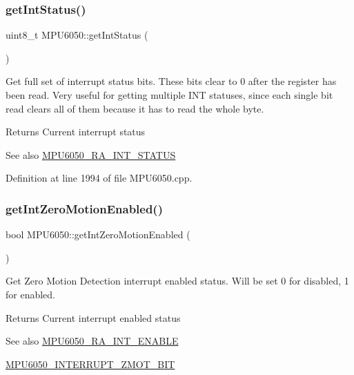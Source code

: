 \subsubsection{\texorpdfstring{getIntStatus()}{getIntStatus()}}
{\footnotesize\ttfamily uint8\+\_\+t M\+P\+U6050\+::get\+Int\+Status (\begin{DoxyParamCaption}{ }\end{DoxyParamCaption})}

Get full set of interrupt status bits. These bits clear to 0 after the register has been read. Very useful for getting multiple I\+NT statuses, since each single bit read clears all of them because it has to read the whole byte. \begin{DoxyReturn}{Returns}
Current interrupt status 
\end{DoxyReturn}
\begin{DoxySeeAlso}{See also}
\mbox{\hyperlink{MPU6050_8h_a8337320c5ccc92def830e968d2e19d75}{M\+P\+U6050\+\_\+\+R\+A\+\_\+\+I\+N\+T\+\_\+\+S\+T\+A\+T\+US}} 
\end{DoxySeeAlso}


Definition at line 1994 of file M\+P\+U6050.\+cpp.


\begin{DoxyCode}{0}

\end{DoxyCode}
\mbox{\label{classMPU6050_ab3cc9bcaca6cec61e7f3f0c6c8a37db5}} 
\subsubsection{\texorpdfstring{getIntZeroMotionEnabled()}{getIntZeroMotionEnabled()}}
{\footnotesize\ttfamily bool M\+P\+U6050\+::get\+Int\+Zero\+Motion\+Enabled (\begin{DoxyParamCaption}{ }\end{DoxyParamCaption})}

Get Zero Motion Detection interrupt enabled status. Will be set 0 for disabled, 1 for enabled. \begin{DoxyReturn}{Returns}
Current interrupt enabled status 
\end{DoxyReturn}
\begin{DoxySeeAlso}{See also}
\mbox{\hyperlink{MPU6050_8h_a1de9d9557aa7420c746721999df4a377}{M\+P\+U6050\+\_\+\+R\+A\+\_\+\+I\+N\+T\+\_\+\+E\+N\+A\+B\+LE}} 

\mbox{\hyperlink{MPU6050_8h_aa4a24f325b4449adf83ce8458bb31a08}{M\+P\+U6050\+\_\+\+I\+N\+T\+E\+R\+R\+U\+P\+T\+\_\+\+Z\+M\+O\+T\+\_\+\+B\+IT}} 
\end{DoxySeeAlso}


